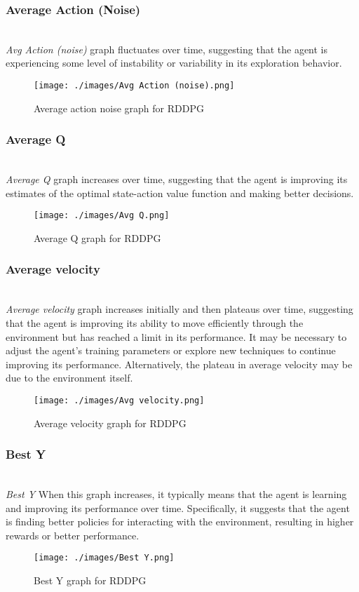 \documentclass[preprint,12pt]{elsarticle}
\begin{document}
\subsubsection{Average Action (Noise)}\\
\textit{Avg Action (noise)} graph fluctuates over time, suggesting that the agent is experiencing some level of instability or variability in its exploration behavior.
\begin{figure}[!htbp]
    \centering
    \texttt{[image: ./images/Avg Action (noise).png]}
    \caption{Average action noise graph for RDDPG}
\end{figure}

\subsubsection{Average Q}\\
\textit{Average Q} graph increases over time, suggesting that the agent is improving its estimates of the optimal state-action value function and making better decisions.
\begin{figure}[!htbp]
    \centering
    \texttt{[image: ./images/Avg Q.png]}
    \caption{Average Q graph for RDDPG}
\end{figure}

\subsubsection{Average velocity}\\
\textit{Average velocity} graph increases initially and then plateaus over time, suggesting that the agent is improving its ability to move efficiently through the environment but has reached a limit in its performance. It may be necessary to adjust the agent's training parameters or explore new techniques to continue improving its performance. Alternatively, the plateau in average velocity may be due to the environment itself.
\begin{figure}[!htbp]
    \centering
    \texttt{[image: ./images/Avg velocity.png]}
    \caption{Average velocity graph for RDDPG}
\end{figure}

\subsubsection{Best Y}\\
\textit{Best Y} When this graph increases, it typically means that the agent is learning and improving its performance over time. Specifically, it suggests that the agent is finding better policies for interacting with the environment, resulting in higher rewards or better performance.
\begin{figure}[!htbp]
    \centering
    \texttt{[image: ./images/Best Y.png]}
    \caption{Best Y graph for RDDPG}
\end{figure}
\end{document}
